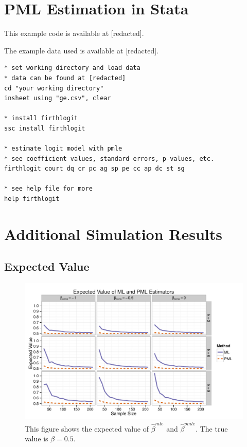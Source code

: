 \documentclass[12pt]{article}
\begin{document}
\begin{appendix}
\section{PML Estimation in Stata}\label{sec:pmle-in-stata}

This example code is available at [redacted].%

\noindent The example data used is available at [redacted].%


\begin{footnotesize}
\begin{verbatim}
* set working directory and load data
* data can be found at [redacted] 
cd "your working directory"
insheet using "ge.csv", clear

* install firthlogit
ssc install firthlogit

* estimate logit model with pmle
* see coefficient values, standard errors, p-values, etc.
firthlogit court dq cr pc ag sp pe cc ap dc st sg

* see help file for more
help firthlogit

\end{verbatim}
\end{footnotesize}


\section{Additional Simulation Results}\label{sec:app-sims}

\subsection{Expected Value}

\begin{figure}[H]
\begin{center}
\includegraphics[width = \textwidth]{figs/sims-ev.pdf}
\caption{This figure shows the expected value of $\hat{\beta}^{mle}$ and $\hat{\beta}^{pmle}$. The true value is $\beta = 0.5$.}\label{fig:ev}
\end{center}
\end{figure}


\end{appendix}
\end{document}
